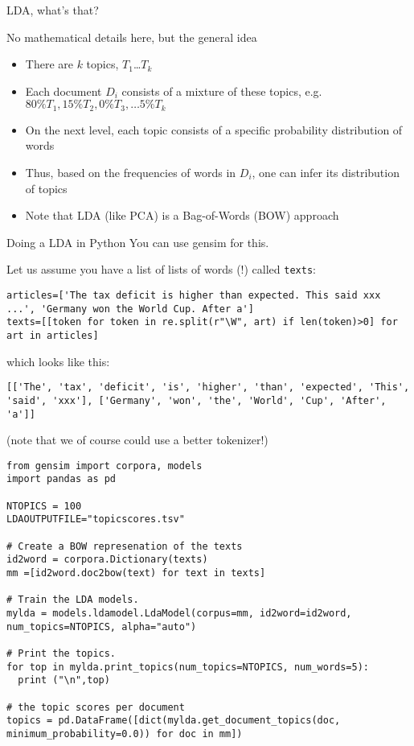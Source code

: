 \begin{frame}{LDA, what's that?}
  \begin{block}{No mathematical details here, but the general idea}
    \begin{itemize}
    \item There are $k$ topics, $T_1$\ldots$T_k$
    \item Each document $D_i$ consists of a mixture of these topics, e.g.$80\% T_1, 15\% T_2, 0\% T_3, \ldots 5\% T_k $
    \item On the next level, each topic consists of a specific probability distribution of words
    \item Thus, based on the frequencies of words in $D_i$, one can infer its distribution of topics
    \item Note that LDA (like PCA) is a Bag-of-Words (BOW) approach
    \end{itemize}
  \end{block}
	
\end{frame}




\begin{frame}[fragile]{Doing a LDA in Python}
You can use gensim \cite{Rehurek2010} for this.

Let us assume you have a list of lists of words (!) called \texttt{texts}:

\begin{lstlisting}
articles=['The tax deficit is higher than expected. This said xxx ...', 'Germany won the World Cup. After a']
texts=[[token for token in re.split(r"\W", art) if len(token)>0] for art in articles]
\end{lstlisting}
which looks like this:
\begin{lstlisting}
[['The', 'tax', 'deficit', 'is', 'higher', 'than', 'expected', 'This', 'said', 'xxx'], ['Germany', 'won', 'the', 'World', 'Cup', 'After', 'a']]
\end{lstlisting}
(note that we of course could use a better tokenizer!)
\end{frame}




\begin{frame}
\begin{lstlisting}
from gensim import corpora, models
import pandas as pd

NTOPICS = 100
LDAOUTPUTFILE="topicscores.tsv"

# Create a BOW represenation of the texts
id2word = corpora.Dictionary(texts)
mm =[id2word.doc2bow(text) for text in texts]

# Train the LDA models.
mylda = models.ldamodel.LdaModel(corpus=mm, id2word=id2word, num_topics=NTOPICS, alpha="auto")

# Print the topics.
for top in mylda.print_topics(num_topics=NTOPICS, num_words=5):
  print ("\n",top)

# the topic scores per document
topics = pd.DataFrame([dict(mylda.get_document_topics(doc, minimum_probability=0.0)) for doc in mm])

\end{lstlisting}
\end{frame}


